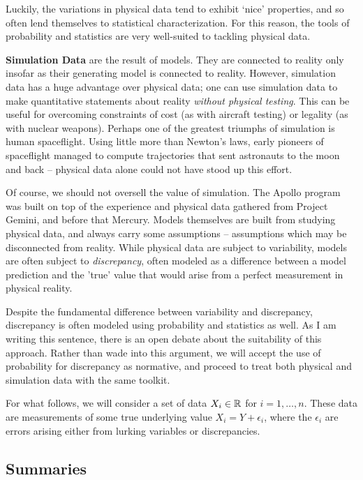 \documentclass[../primer.tex]{subfiles}
\begin{document}
Luckily, the variations in physical data tend to exhibit `nice' properties, and
so often lend themselves to statistical characterization. For this reason, the
tools of probability and statistics are very well-suited to tackling physical
data.

\textbf{Simulation Data} are the result of models. They are connected to reality
only insofar as their generating model is connected to reality. However,
simulation data has a huge advantage over physical data; one can use simulation
data to make quantitative statements about reality \emph{without physical
  testing}. This can be useful for overcoming constraints of cost (as with
aircraft testing) or legality (as with nuclear weapons). Perhaps one of the
greatest triumphs of simulation is human spaceflight. Using little more than
Newton's laws, early pioneers of spaceflight managed to compute trajectories
that sent astronauts to the moon and back -- physical data alone could not have
stood up this effort.

Of course, we should not oversell the value of simulation. The Apollo program
was built on top of the experience and physical data gathered from Project
Gemini, and before that Mercury. Models themselves are built from studying
physical data, and always carry some assumptions -- assumptions which may be
disconnected from reality. While physical data are subject to variability,
models are often subject to \emph{discrepancy}, often modeled as a difference
between a model prediction and the 'true' value that would arise from a perfect
measurement in physical reality.\cite{higdon2004calibration-prediction}

Despite the fundamental difference between variability and discrepancy,
discrepancy is often modeled using probability and statistics as
well.\cite{kennedy2001bayesian,higdon2004calibration-prediction} As I am writing
this sentence, there is an open debate about the suitability of this approach.
Rather than wade into this argument, we will accept the use of probability for
discrepancy as normative, and proceed to treat both physical and simulation data
with the same toolkit.

For what follows, we will consider a set of data $X_i\in\mathbb{R}^{}$ for $i =
1,\dots,n$. These data are measurements of some true underlying value $X_i = Y +
\epsilon_i$, where the $\epsilon_i$ are errors arising either from lurking
variables or discrepancies.

\subsection{Summaries}
\end{document}
